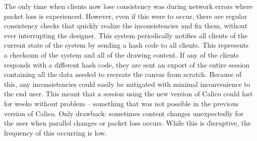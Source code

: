 The only time when clients now lose consistency was during network errors where packet loss is experienced. However, even if this were to occur, there are regular consistency checks that quickly realize the inconsistencies and fix them, without ever interrupting the designer. This system periodically notifies all clients of the current state of the system by sending a hash code to all clients. This represents a checksum of the system and all of the drawing content. If any of the clients responds with a different hash code, they are sent an export of the entire session containing all the data needed to recreate the canvas from scratch. Because of this, any inconsistencies could easily be mitigated with minimal inconvenience to the end user. This meant that a session using the new version of Calico could last for weeks without problem -- something that was not possible in the previous version of Calico. Only drawback: sometimes content changes unexpectedly for the user when parallel changes or packet loss occurs. While this is disruptive, the frequency of this occurring is low.
